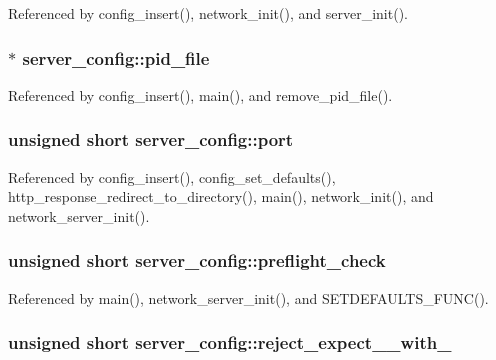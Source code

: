 Referenced by config\-\_\-insert(), network\-\_\-init(), and server\-\_\-init().

\hypertarget{structserver__config_ad4a5f5cea7a714d24d39808484eaff76}{
\subsubsection[{pid\-\_\-file}]{$\ast$ server\-\_\-config\-::pid\-\_\-file}}\label{structserver__config_ad4a5f5cea7a714d24d39808484eaff76}


Referenced by config\-\_\-insert(), main(), and remove\-\_\-pid\-\_\-file().

\hypertarget{structserver__config_ac5aeb6f87f80796f8082d21bcb8ed307}{
\subsubsection[{port}]{\setlength{\rightskip}{0pt plus 5cm}unsigned short server\-\_\-config\-::port}}\label{structserver__config_ac5aeb6f87f80796f8082d21bcb8ed307}


Referenced by config\-\_\-insert(), config\-\_\-set\-\_\-defaults(), http\-\_\-response\-\_\-redirect\-\_\-to\-\_\-directory(), main(), network\-\_\-init(), and network\-\_\-server\-\_\-init().

\hypertarget{structserver__config_a21ecff523665604359cbcd56cc12bb84}{
\subsubsection[{preflight\-\_\-check}]{\setlength{\rightskip}{0pt plus 5cm}unsigned short server\-\_\-config\-::preflight\-\_\-check}}\label{structserver__config_a21ecff523665604359cbcd56cc12bb84}


Referenced by main(), network\-\_\-server\-\_\-init(), and S\-E\-T\-D\-E\-F\-A\-U\-L\-T\-S\-\_\-\-F\-U\-N\-C().

\hypertarget{structserver__config_a3b30a0c8d1ae1fc6838e0f242f28798e}{
\subsubsection[{reject\-\_\-expect\-\_\-100\-\_\-with\-\_\-417}]{\setlength{\rightskip}{0pt plus 5cm}unsigned short server\-\_\-config\-::reject\-\_\-expect\-\_\-\_\-with\-\_}}\label{structserver__config_a3b30a0c8d1ae1fc6838e0f242f28798e}


